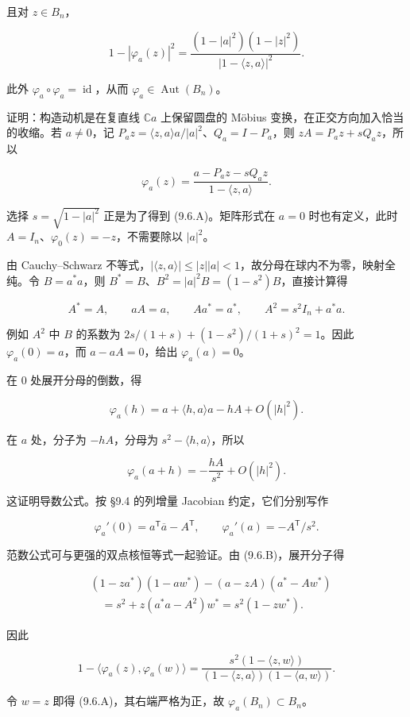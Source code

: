 \documentclass[11pt,a4paper]{article}
\begin{document}
且对 \(z\in B_n\)，

\[
1-|\varphi_a(z)|^2
=\frac{(1-|a|^2)(1-|z|^2)}{|1-\langle z,a\rangle|^2}.
\tag{9.6.A}
\]

此外 \(\varphi_a\circ\varphi_a=\operatorname{id}\)，从而
\(\varphi_a\in\operatorname{Aut}(B_n)\)。

证明：构造动机是在复直线 \(\mathbb Ca\) 上保留圆盘的 Möbius
变换，在正交方向加入恰当的收缩。若 \(a\ne0\)，记
\(P_az=\langle z,a\rangle a/|a|^2\)、\(Q_a=I-P_a\)，则
\(zA=P_az+sQ_az\)，所以

\[
\varphi_a(z)=\frac{a-P_az-sQ_az}{1-\langle z,a\rangle}.
\]

选择 \(s=\sqrt{1-|a|^2}\) 正是为了得到 (9.6.A)。矩阵形式在 \(a=0\)
时也有定义，此时 \(A=I_n\)、\(\varphi_0(z)=-z\)，不需要除以 \(|a|^2\)。

由 Cauchy--Schwarz
不等式，\(|\langle z,a\rangle|\le|z||a|<1\)，故分母在球内不为零，映射全纯。令
\(B=a^*a\)，则 \(B^*=B\)、\(B^2=|a|^2B=(1-s^2)B\)，直接计算得

\[
A^*=A,\qquad aA=a,\qquad Aa^*=a^*,\qquad
A^2=s^2I_n+a^*a.
\tag{9.6.B}
\]

例如 \(A^2\) 中 \(B\) 的系数为 \(2s/(1+s)+(1-s^2)/(1+s)^2=1\)。因此
\(\varphi_a(0)=a\)，而 \(a-aA=0\)，给出 \(\varphi_a(a)=0\)。

在 \(0\) 处展开分母的倒数，得

\[
\varphi_a(h)=a+\langle h,a\rangle a-hA+O(|h|^2).
\]

在 \(a\) 处，分子为 \(-hA\)，分母为 \(s^2-\langle h,a\rangle\)，所以

\[
\varphi_a(a+h)=-\frac{hA}{s^2}+O(|h|^2).
\]

这证明导数公式。按 §9.4 的列增量 Jacobian 约定，它们分别写作

\[
\varphi_a'(0)=a^{\mathsf T}\overline a-A^{\mathsf T},\qquad
\varphi_a'(a)=-A^{\mathsf T}/s^2.
\]

范数公式可与更强的双点核恒等式一起验证。由 (9.6.B)，展开分子得

\[
\begin{aligned}
&(1-za^*)(1-aw^*)-(a-zA)(a^*-Aw^*)\\
&\hspace{1em}=s^2+z(a^*a-A^2)w^*
=s^2(1-zw^*).
\end{aligned}
\]

因此

\[
1-\langle\varphi_a(z),\varphi_a(w)\rangle
=\frac{s^2(1-\langle z,w\rangle)}
{(1-\langle z,a\rangle)(1-\langle a,w\rangle)}.
\tag{9.6.C}
\]

令 \(w=z\) 即得 (9.6.A)，其右端严格为正，故
\(\varphi_a(B_n)\subset B_n\)。
\end{document}
